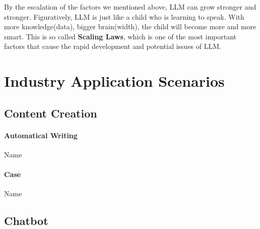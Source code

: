 \documentclass[fleqn,10pt]{SelfArx} %
\begin{document}
By the escalation of the factors we mentioned above, LLM can grow stronger and stronger. Figuratively, LLM is just like a child who is learning to speak. With more knowledge(data), bigger brain(width), the child will become more and more smart. This is so called \textbf{Scaling Laws}, which is one of the most important factors that cause the rapid development and potential issues of LLM.








\section{Industry Application Scenarios}


\subsection{Content Creation}

\paragraph{Automatical Writing} Name %

\paragraph{Case} Name %


\subsection{Chatbot}
\end{document}
